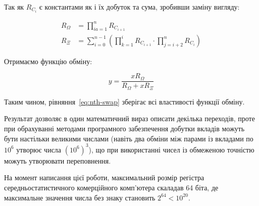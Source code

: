 \documentclass[../index.tex]{subfiles}
\begin{document}
Так як $R_{C_{i}}$ є константами як і їх добуток та сума, зробивши заміну вигляду:

\begin{equation}\label{eq:swap-omega-xi}
\begin{aligned}
  R_{\Omega} &= \prod_{ia=1}^n R_{C_{i+1}} \\
  R_{\Xi} &= \sum_{i=0}^{n-1} \left( \prod_{k=1}^i R_{C_{i+1}} \cdot \prod_{j=i+2}^{n}  R_{C_{i}} \right)
\end{aligned}
\end{equation}

Отримаємо функцію обміну:

\begin{equation*}
y = \frac{x R_{\Omega}}{R_{\Omega} + x R_{\Xi}}
\end{equation*}

Таким чином, рівняння~\eqref{eq:nth-swap} зберігає всі властивості функції
обміну.

Результат дозволяє в один математичний вираз описати декілька переходів, проте
при обрахуванні методами програмного забезпечення добутки вкладів можуть бути
настільки великими числами (навіть два обміни між парами із вкладами по \(10^6\)
утворює числа \({(10^6)}^3\)), що при використанні чисел із обмеженою точністю
можуть утворювати переповнення.

На момент написання цієї роботи, максимальний розмір регістра
середньостатистичного комерційного комп'ютера скаладав 64 біта, де максимальне
значення числа без знаку становить \(2^{64} < 10^{20}\).
\end{document}
